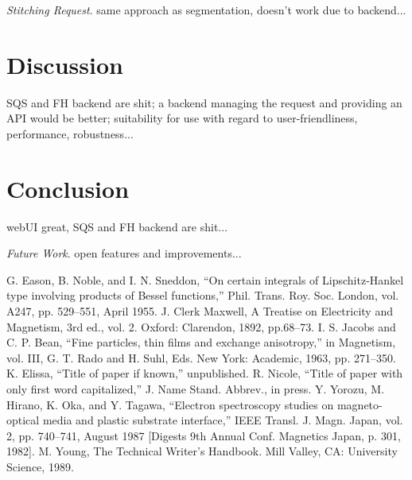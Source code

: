 \documentclass[conference]{IEEEtran}
\begin{document}
\textit{Stitching Request}.
same approach as segmentation, doesn't work due to backend...

\section{Discussion}
SQS and FH backend are shit; a backend managing the request and providing an API would be better; suitability for use with regard to user-friendliness, performance, robustness...

\section{Conclusion}
webUI great, SQS and FH backend are shit...

\textit{Future Work}. open features and improvements...

\begin{thebibliography}{00}
 G. Eason, B. Noble, and I. N. Sneddon, ``On certain integrals of Lipschitz-Hankel type involving products of Bessel functions,'' Phil. Trans. Roy. Soc. London, vol. A247, pp. 529--551, April 1955.
 J. Clerk Maxwell, A Treatise on Electricity and Magnetism, 3rd ed., vol. 2. Oxford: Clarendon, 1892, pp.68--73.
 I. S. Jacobs and C. P. Bean, ``Fine particles, thin films and exchange anisotropy,'' in Magnetism, vol. III, G. T. Rado and H. Suhl, Eds. New York: Academic, 1963, pp. 271--350.
 K. Elissa, ``Title of paper if known,'' unpublished.
 R. Nicole, ``Title of paper with only first word capitalized,'' J. Name Stand. Abbrev., in press.
 Y. Yorozu, M. Hirano, K. Oka, and Y. Tagawa, ``Electron spectroscopy studies on magneto-optical media and plastic substrate interface,'' IEEE Transl. J. Magn. Japan, vol. 2, pp. 740--741, August 1987 [Digests 9th Annual Conf. Magnetics Japan, p. 301, 1982].
 M. Young, The Technical Writer's Handbook. Mill Valley, CA: University Science, 1989.
\end{thebibliography}
\end{document}
